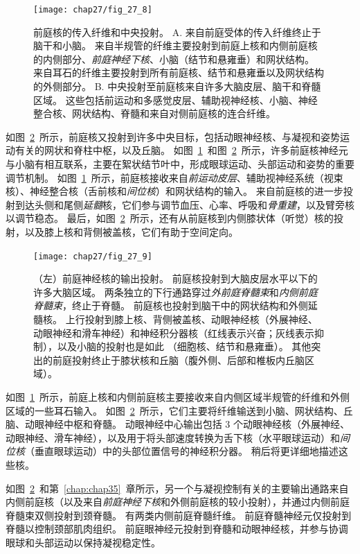 \begin{figure}[htbp]
	\centering
	\texttt{[image: chap27/fig\_27\_8]}
	\caption{前庭核的传入纤维和中央投射。
		A. 来自前庭受体的传入纤维终止于脑干和小脑。
		来自半规管的纤维主要投射到前庭上核和内侧前庭核的内侧部分、\textit{前庭神经下核}、小脑（结节和悬雍垂）和网状结构。
		来自耳石的纤维主要投射到所有前庭核、结节和悬雍垂以及网状结构的外侧部分\cite{gacek1974localization}。
		B. 中央投射至前庭核来自许多大脑皮层、脑干和脊髓区域。
		这些包括前运动和多感觉皮层、辅助视神经核、小脑、神经整合核、网状结构、脊髓和来自对侧前庭核的连合纤维。}
	\label{fig:27_8}
\end{figure}


如图~\ref{fig:27_9}~所示，前庭核又投射到许多中央目标，包括动眼神经核、与凝视和姿势运动有关的网状和脊柱中枢，以及丘脑。
如图~\ref{fig:27_8}~和图~\ref{fig:27_9}~所示，许多前庭核神经元与小脑有相互联系，主要在絮状结节叶中，形成眼球运动、头部运动和姿势的重要调节机制。
如图~\ref{fig:27_8}~所示，前庭核接收来自\textit{前运动皮层}、辅助视神经系统（视束核）、神经整合核（舌前核和\textit{间位核}）和网状结构的输入。
来自前庭核的进一步投射到达头侧和尾侧\textit{延髓}核，它们参与调节血压、心率、呼吸和\textit{骨重建}，以及臂旁核以调节稳态。
最后，如图~\ref{fig:27_9}~所示，还有从前庭核到内侧膝状体（听觉）核的投射，以及膝上核和背侧被盖核，它们有助于空间定向。


\begin{figure}[htbp]
	\centering
	\texttt{[image: chap27/fig\_27\_9]}
	\caption{（左）前庭神经核的输出投射。
		前庭核投射到大脑皮层水平以下的许多大脑区域。
		两条独立的下行通路穿过\textit{外前庭脊髓束}和\textit{内侧前庭脊髓束}，终止于脊髓。
		前庭核也投射到脑干中的网状结构和外侧延髓核。
		上行投射到膝上核、背侧被盖核、动眼神经核（外展神经、动眼神经和滑车神经）和神经积分器核（红线表示兴奋；灰线表示抑制），以及小脑的投射也是如此 （细胞核、结节和悬雍垂）。
		其他突出的前庭投射终止于膝状核和丘脑（腹外侧、后部和椎板内丘脑区域）。}
	\label{fig:27_9}
\end{figure}


如图~\ref{fig:27_8}~所示，前庭上核和内侧前庭核主要接收来自内侧区域半规管的纤维和外侧区域的一些耳石输入。
如图~\ref{fig:27_9}~所示，它们主要将纤维输送到小脑、网状结构、丘脑、动眼神经中枢和脊髓。
动眼神经中心输出包括 3 个动眼神经核（外展神经、动眼神经、滑车神经），以及用于将头部速度转换为舌下核（水平眼球运动）和\textit{间位核}（垂直眼球运动）中的头部位置信号的神经积分器。
稍后将更详细地描述这些核。


如图~\ref{fig:27_9}~和第~\ref{chap:chap35}~章所示，另一个与凝视控制有关的主要输出通路来自内侧前庭核（以及来自\textit{前庭神经下核}和外侧前庭核的较小投射），并通过内侧前庭脊髓束双侧投射到颈脊髓。
有两类内侧前庭脊髓纤维。
前庭脊髓神经元仅投射到脊髓以控制颈部肌肉组织。
前庭眼神经元投射到脊髓和动眼神经核，并参与协调眼球和头部运动以保持凝视稳定性。


